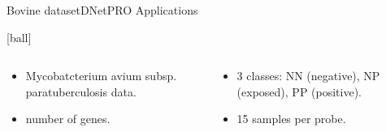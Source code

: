 \documentclass{standalone}
\begin{document}
\begin{frame}{Bovine dataset}{DNetPRO Applications}

  [ball]

  \begin{columns}

    \begin{column}{0.5\linewidth}

      \begin{itemize}
        \item Mycobatcterium avium subsp. paratuberculosis data.
        \item {} number of genes.
      \end{itemize}

    \end{column}

    \begin{column}{0.5\linewidth}

      \begin{itemize}
        \item 3 classes: NN (negative), NP (exposed), PP (positive).
        \item 15 samples per probe.
      \end{itemize}

    \end{column}

  \end{columns}

  \begin{figure}
    \centering
    \def\svgwidth{0.9\linewidth}
    
  \end{figure}

\end{frame}
\end{document}
